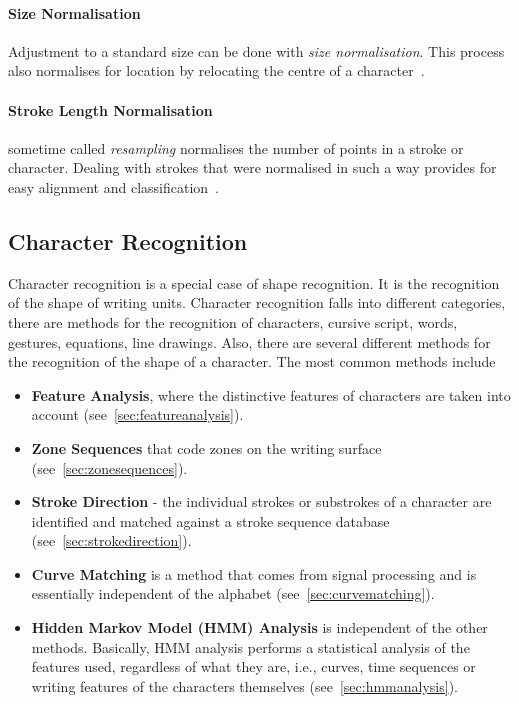 \paragraph{Size Normalisation}
Adjustment to a standard size can be done with \emph{size normalisation}. This 
process also normalises for location by relocating the centre of a 
character~.

\paragraph{Stroke Length Normalisation}
sometime called \emph{resampling} normalises
the number of points in a stroke or character. Dealing with strokes that were 
normalised in such a way provides for easy alignment and 
classification~. 

\subsection{Character Recognition}
\label{sec:characterrecognition}


Character recognition is a special case of shape recognition. It is the 
recognition of the shape of writing units. Character recognition falls into
different categories, there are methods for the recognition of characters,
cursive script, words, gestures, equations, line drawings. Also, there are 
several different methods for the recognition of the shape of a character.
The most common methods include 
\begin{itemize}
  \item \textbf{Feature Analysis}, where the distinctive features of characters 
    are taken into account (see~\ref{sec:featureanalysis}).
  \item \textbf{Zone Sequences} that code zones on the writing surface
    (see~\ref{sec:zonesequences}).
  \item \textbf{Stroke Direction} - the individual strokes or substrokes of a
    character are identified and matched against a stroke sequence database
    (see~\ref{sec:strokedirection}).
  \item \textbf{Curve Matching} is a method that comes from signal processing
    and is essentially independent of the alphabet (see~\ref{sec:curvematching}).
  \item \textbf{Hidden Markov Model (HMM) Analysis} is independent of the other methods.
    Basically, HMM analysis performs a statistical analysis of the features used, 
    regardless of what they are, i.e., curves, time sequences or writing features
    of the characters themselves (see~\ref{sec:hmmanalysis}).
\end{itemize}


